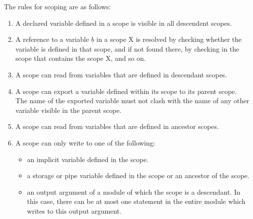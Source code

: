 \documentclass{article}
\begin{document}
The rules for scoping are as follows:
\begin{enumerate}
\item A declared variable defined in a scope is visible
in all descendent scopes. 
\item A reference to a variable $b$ in a scope X is resolved by checking
whether the variable is defined in that scope, and if not found there,
by checking in the scope that contains the scope X, and so on.
\item A scope can read from variables that are defined in descendant
scopes.  
\item A scope can export a variable defined within its scope to
its parent scope.   The name  of the exported variable must not
clash with the name of any other variable visible in the
parent scope.
\item A scope can read from variables that are defined in ancestor scopes.
\item A scope can only write to one of the following:
\begin{itemize}
\item an implicit variable defined in the scope.
\item a storage or pipe variable defined in the scope or an ancestor
of the scope.
\item an output argument of a module of which the scope is a descendant.
In this case, there can be at most one statement in the entire module
which writes to this output argument.
\end{itemize}
\end{enumerate}
\end{document}
